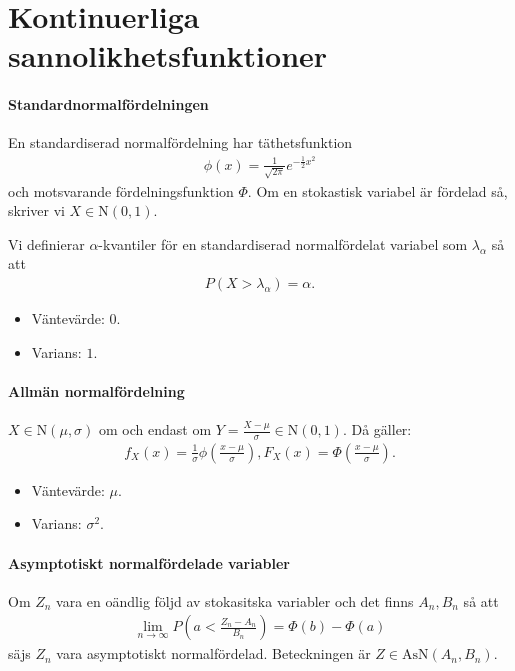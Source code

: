\section{Kontinuerliga sannolikhetsfunktioner}

\paragraph{Standardnormalfördelningen}
En standardiserad normalfördelning har täthetsfunktion
\begin{align*}
	\phi(x) = \frac{1}{\sqrt{2\pi}}e^{-\frac{1}{2}x^2}
\end{align*}
och motsvarande fördelningsfunktion $\Phi$. Om en stokastisk variabel är fördelad så, skriver vi $X\in\text{N}(0,1)$.

Vi definierar $\alpha$-kvantiler för en standardiserad normalfördelat variabel som $\lambda_\alpha$ så att
\begin{align*}
	P(X > \lambda_\alpha) = \alpha.
\end{align*}

\begin{itemize}
	\item Väntevärde: $0$.
	\item Varians: $1$.
\end{itemize}

\paragraph{Allmän normalfördelning}
$X\in\text{N}(\mu, \sigma)$ om och endast om $Y = \frac{X - \mu}{\sigma}\in\text{N}(0, 1)$. Då gäller:
\begin{align*}
	f_X(x) = \frac{1}{\sigma}\phi\left(\frac{x - \mu}{\sigma}\right), F_X(x) = \Phi\left(\frac{x - \mu}{\sigma}\right).
\end{align*}

\begin{itemize}
	\item Väntevärde: $\mu$.
	\item Varians: $\sigma^2$.
\end{itemize}

\paragraph{Asymptotiskt normalfördelade variabler}
Om $Z_n$ vara en oändlig följd av stokasitska variabler och det finns $A_n, B_n$ så att
\begin{align*}
	\lim\limits_{n\to\infty}P\left(a < \frac{Z_n - A_n}{B_n}\right) = \Phi(b) - \Phi(a)
\end{align*}
säjs $Z_n$ vara asymptotiskt normalfördelad. Beteckningen är $Z\in\text{AsN}(A_n, B_n)$.

